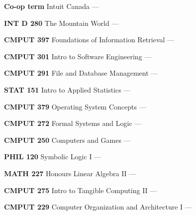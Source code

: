 \begin{cventries}
{\begin{cvitems}
        \vspace{1mm}
      \item {\textbf{Co-op term} Intuit Canada --- }
        \vspace{1mm}
      \item {\textbf{INT D 280} The Mountain World --- }
        \vspace{0.5mm}
      \item {\textbf{CMPUT 397} Foundations of Information Retrieval --- }
        \vspace{0.5mm}
      \item {\textbf{CMPUT 301} Intro to Software Engineering --- }
        \vspace{0.5mm}
      \item {\textbf{CMPUT 291} File and Database Management --- }
        \vspace{1mm}
      \item {\textbf{STAT 151} Intro to Applied Statistics --- }
        \vspace{0.5mm}
      \item {\textbf{CMPUT 379} Operating System Concepts --- }
        \vspace{0.5mm}
      \item {\textbf{CMPUT 272} Formal Systems and Logic --- }
        \vspace{0.5mm}
      \item {\textbf{CMPUT 250} Computers and Games --- }
        \vspace{1mm}
      \item {\textbf{PHIL 120} Symbolic Logic I --- }
        \vspace{0.5mm}
      \item {\textbf{MATH 227} Honours Linear Algebra II --- }
        \vspace{0.5mm}
      \item {\textbf{CMPUT 275} Intro to Tangible Computing II --- }
        \vspace{0.5mm}
      \item {\textbf{CMPUT 229} Computer Organization and Architecture I --- }
        \vspace{1mm}

\end{cvitems}}
\end{cventries}
